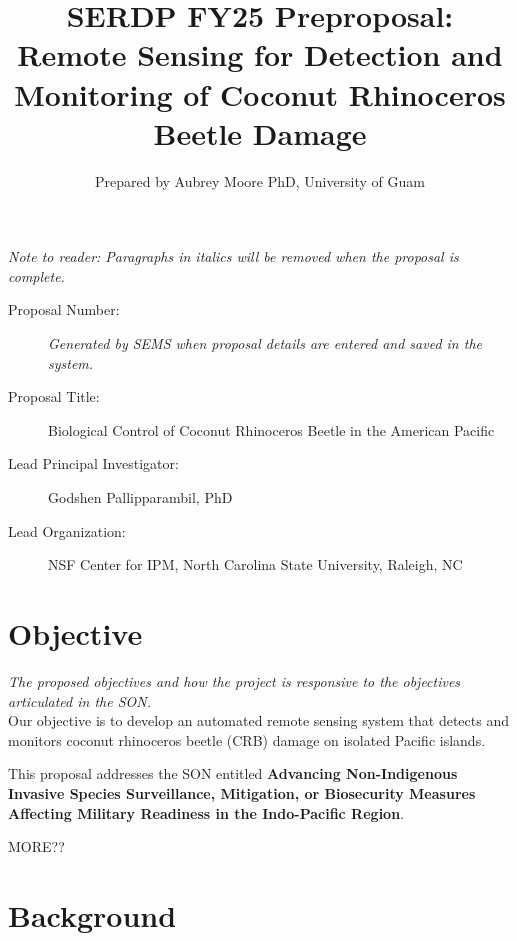 \documentclass[11pt,english,letterpaper]{scrartcl}
\begin{document}
\title{SERDP FY25 Preproposal: Remote Sensing for Detection and Monitoring of Coconut Rhinoceros Beetle Damage}
\author{Prepared by Aubrey Moore PhD, University of Guam}

\maketitle

\tableofcontents{}\clearpage{}

\textit{Note to reader: Paragraphs in italics will be removed when the proposal is complete.}

\begin{description}
	
\item[Proposal Number:] \emph{Generated by SEMS when proposal details are entered and saved in the system.}

\item[Proposal Title:] Biological Control of Coconut Rhinoceros Beetle in the American Pacific

\item[Lead Principal Investigator:] Godshen Pallipparambil, PhD

\item[Lead Organization:] NSF Center for IPM, North Carolina State University, Raleigh, NC

\end{description}

\section{Objective}

\textit{The proposed objectives and how the project is responsive to the objectives
	articulated in the SON.}\\

Our objective is to develop an automated remote sensing system that detects and monitors coconut rhinoceros beetle (CRB) damage on isolated Pacific islands. 

This proposal addresses the SON entitled \textbf{Advancing Non-Indigenous Invasive Species Surveillance, Mitigation, or Biosecurity Measures Affecting Military Readiness in the Indo-Pacific Region}.

MORE??

\section{Background}
\end{document}
